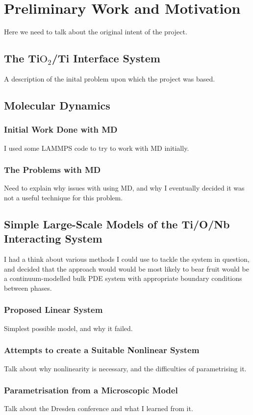 \chapter{Preliminary Work and Motivation}

Here we need to talk about the original intent of the project.

\section{The Ti$\text{O}_2$/Ti Interface System}

A description of the inital problem upon which the project was based.

\section{Molecular Dynamics}

\subsection{Initial Work Done with MD}
I used some LAMMPS code to try to work with MD initially.
\subsection{The Problems with MD}
Need to explain why issues with using MD, and why I eventually decided it was not a useful technique for this problem.

\section{Simple Large-Scale Models of the Ti/O/Nb Interacting System}
I had a think about various methods I could use to tackle the system in question, and decided that the approach would would be most likely to bear fruit would be a continuum-modelled bulk PDE system with appropriate boundary conditions between
phases.
\subsection{Proposed Linear System}
Simplest possible model, and why it failed.
\subsection{Attempts to create a Suitable Nonlinear System}
Talk about why nonlinearity is necessary, and the difficulties of parametrising it.
\subsection{Parametrisation from a Microscopic Model}
Talk about the Dresden conference and what I learned from it.